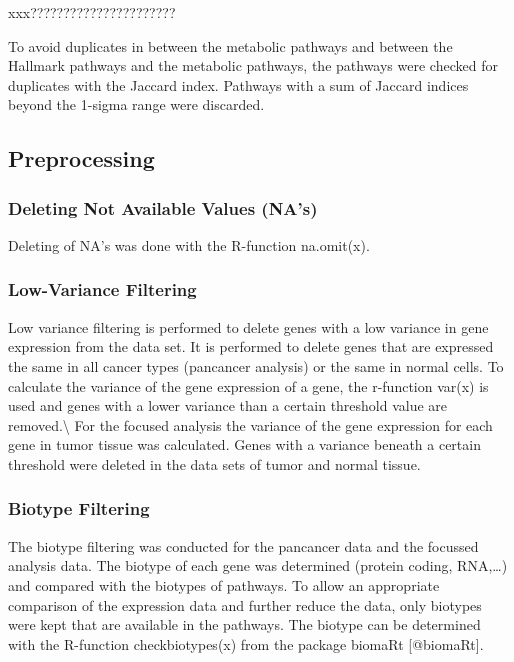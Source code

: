 \documentclass[
]{article}
\begin{document}
xxx??????????????????????

To avoid duplicates in between the metabolic pathways and between the
Hallmark pathways and the metabolic pathways, the pathways were checked
for duplicates with the Jaccard index. Pathways with a sum of Jaccard
indices beyond the 1-sigma range were discarded.

\hypertarget{preprocessing}{%
\subsection{Preprocessing}\label{preprocessing}}

\hypertarget{deleting-not-available-values-nas}{%
\subsubsection{Deleting Not Available Values
(NA's)}\label{deleting-not-available-values-nas}}

Deleting of NA's was done with the R-function na.omit(x).

\hypertarget{low-variance-filtering}{%
\subsubsection{Low-Variance Filtering}\label{low-variance-filtering}}

Low variance filtering is performed to delete genes with a low variance
in gene expression from the data set. It is performed to delete genes
that are expressed the same in all cancer types (pancancer analysis) or
the same in normal cells. To calculate the variance of the gene
expression of a gene, the r-function var(x) is used and genes with a
lower variance than a certain threshold value are
removed.\textbackslash{} For the focused analysis the variance of the
gene expression for each gene in tumor tissue was calculated. Genes with
a variance beneath a certain threshold were deleted in the data sets of
tumor and normal tissue.

\hypertarget{biotype-filtering}{%
\subsubsection{Biotype Filtering}\label{biotype-filtering}}

The biotype filtering was conducted for the pancancer data and the
focussed analysis data. The biotype of each gene was determined (protein
coding, RNA,\ldots) and compared with the biotypes of pathways. To allow
an appropriate comparison of the expression data and further reduce the
data, only biotypes were kept that are available in the pathways. The
biotype can be determined with the R-function checkbiotypes(x) from the
package biomaRt {[}@biomaRt{]}.
\end{document}
